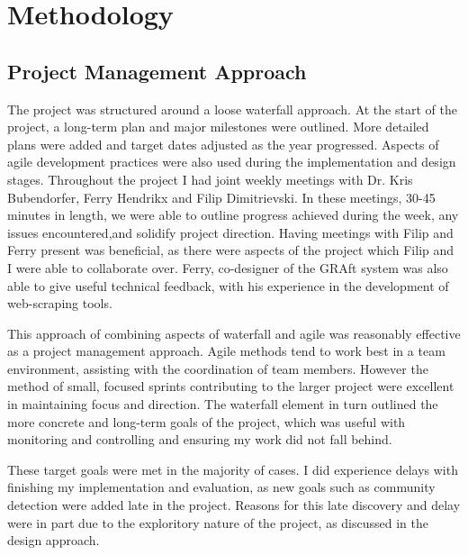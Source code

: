 \chapter{Methodology}\label{C:us}

\section{Project Management Approach}

The project was structured around a loose waterfall approach. At the start of the project, a long-term plan and major milestones were outlined. More detailed plans were added and target dates adjusted as the year progressed. Aspects of agile development practices were also used during the implementation and design stages. Throughout the project I had joint weekly meetings with Dr. Kris Bubendorfer,  Ferry Hendrikx and Filip Dimitrievski. In these meetings, 30-45 minutes in length, we were able to outline progress achieved during the week, any issues encountered,and solidify project direction. Having meetings with Filip and Ferry present was beneficial, as there were aspects of the project which Filip and I were able to collaborate over. Ferry, co-designer of the GRAft system was also able to give useful technical feedback, with his experience in the development of web-scraping tools.

This approach of combining aspects of waterfall and agile was reasonably effective as a project management approach. Agile methods tend to work best in a team environment, assisting with the coordination of team members. However the method of small, focused sprints contributing to the larger project were excellent in maintaining focus and direction. The waterfall element in turn outlined the more concrete and long-term goals of the project, which was useful with monitoring and controlling and ensuring my work did not fall behind.

These target goals were met in the majority of cases. I did experience delays with finishing my implementation and evaluation, as new goals such as community detection were added late in the project. Reasons for this late discovery and delay were in part due to the exploritory nature of the project, as discussed in the design approach. %


